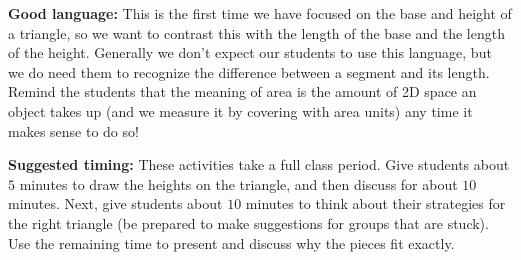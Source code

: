 \documentclass[nooutcomes,noauthor]{ximera}
\begin{document}
\begin{instructorNotes}
{\bf Good language:} This is the first time we have focused on the base and height of a triangle, so we want to contrast this with the length of the base and the length of the height. Generally we don't expect our students to use this language, but we do need them to recognize the difference between a segment and its length. Remind the students that the meaning of area is the amount of 2D space an object takes up (and we measure it by covering with area units) any time it makes sense to do so!



{\bf Suggested timing:} These activities take a full class period. Give students about $5$ minutes to draw the heights on the triangle, and then discuss for about $10$ minutes. Next, give students about $10$ minutes to think about their strategies for the right triangle (be prepared to make suggestions for groups that are stuck). Use the remaining time to present and discuss why the pieces fit exactly.



\end{instructorNotes}
\end{document}
